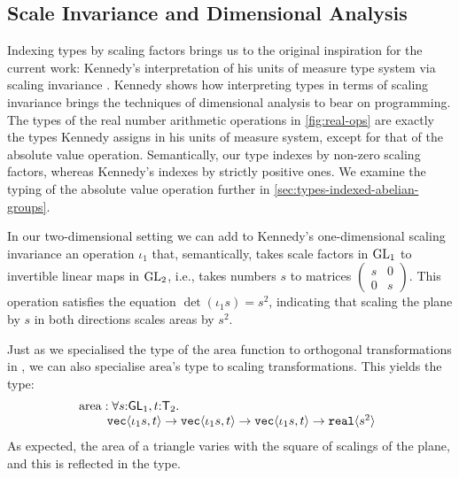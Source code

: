 
\subsection{Scale Invariance and Dimensional Analysis}
\label{sec:scale-invariance}

Indexing types by scaling factors brings us to the original
inspiration for the current work: Kennedy's interpretation of his
units of measure type system via scaling invariance
\cite{kennedy97relational}. Kennedy shows how interpreting types in
terms of scaling invariance brings the techniques of dimensional
analysis to bear on programming. The types of the real number
arithmetic operations in \autoref{fig:real-ops} are exactly the types
Kennedy assigns in his units of measure system, except for that of the
absolute value operation. Semantically, our type indexes by
non-zero scaling factors, whereas Kennedy's indexes by strictly
positive ones. We examine the typing of the absolute value operation
further in \autoref{sec:types-indexed-abelian-groups}.

In our two-dimensional setting we can add to Kennedy's one-dimensional
scaling invariance an operation $\iota_1$ that, semantically, takes
scale factors in $\mathrm{GL}_1$ to invertible linear maps in $\mathrm{GL}_2$,
i.e., takes numbers $s$ to matrices $\left(
  \begin{smallmatrix}s & 0 \\ 0 & s\end{smallmatrix}\right)$.  This
operation satisfies the equation $\det (\iota_1 s) = s^2$, indicating
that scaling the plane by $s$ in both directions scales areas by
$s^2$. %

\begin{example}\label{ex:area-of-triangle-2}
  Just as we specialised the type of the $\mathrm{area}$ function to
  orthogonal transformations in , we can
  also specialise $\mathrm{area}$'s type to scaling
  transformations. This yields the type:
  \begin{displaymath}
    \begin{array}{@{}l}
      \mathrm{area} : \forall s\mathord:\SynGL{1}, t\mathord:\SynTransl{2}.\ \\
      \hspace{0.8cm} \tyPrim{vec}{\iota_1s, t} \to \tyPrim{vec}{\iota_1s, t} \to \tyPrim{vec}{\iota_1s, t} \to \tyPrim{real}{s^2}
    \end{array}
  \end{displaymath}
  As expected, the area of a triangle varies with the square of
  scalings of the plane, and this is reflected in the type.
\end{example}

